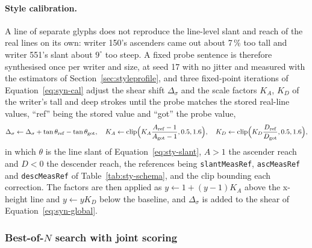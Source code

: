 \paragraph{Style calibration.}
\label{sec:syn-cal}
A line of separate glyphs does not reproduce the line-level slant and reach of the real lines on its own: writer 150's ascenders came out about 7\,\% too tall and writer 551's slant about $9^\circ$ too steep.
A fixed probe sentence is therefore synthesised once per writer and size, at seed 17 with no jitter and measured with the estimators of Section~\ref{sec:styleprofile}, and three fixed-point iterations of Equation~\ref{eq:syn-cal} adjust the shear shift $\Delta_\sigma$ and the scale factors $K_A$, $K_D$ of the writer's tall and deep strokes until the probe matches the stored real-line values, ``ref'' being the stored value and ``got'' the probe value,
\begin{equation}
\Delta_\sigma\leftarrow\Delta_\sigma+\tan\theta_{\mathrm{ref}}-\tan\theta_{\mathrm{got}},\quad K_A\leftarrow\operatorname{clip}\Bigl(K_A\frac{A_{\mathrm{ref}}-1}{A_{\mathrm{got}}-1},0.5,1.6\Bigr),\quad K_D\leftarrow\operatorname{clip}\Bigl(K_D\frac{D_{\mathrm{ref}}}{D_{\mathrm{got}}},0.5,1.6\Bigr),
\label{eq:syn-cal}
\end{equation}
in which $\theta$ is the line slant of Equation~\ref{eq:sty-slant}, $A>1$ the ascender reach and $D<0$ the descender reach, the references being \texttt{slantMeasRef}, \texttt{ascMeasRef} and \texttt{descMeasRef} of Table~\ref{tab:sty-schema}, and the clip bounding each correction.
The factors are then applied as $y\leftarrow1+(y-1)K_A$ above the x-height line and $y\leftarrow yK_D$ below the baseline, and $\Delta_\sigma$ is added to the shear of Equation~\ref{eq:syn-global}.

\subsubsection{Best-of-$N$ search with joint scoring}
\label{sec:syn-search}

